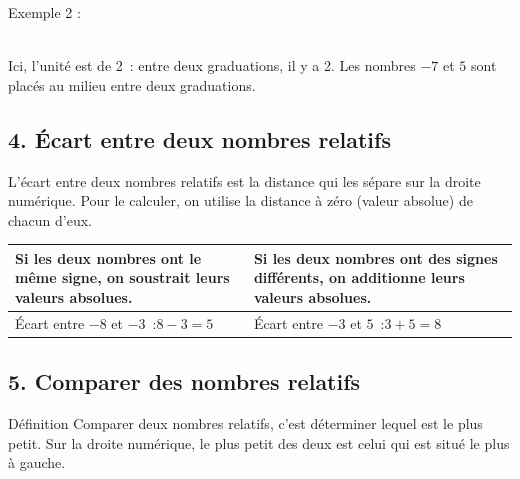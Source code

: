 \vspace{10pt}
Exemple 2 :

\begin{center}
\\[6pt]
Ici, l'unité est de 2~: entre deux graduations, il y a 2. Les nombres $-7$ et $5$ sont placés au milieu entre deux graduations.
\end{center}

\vfill
\subsection*{4. Écart entre deux nombres relatifs}

L'\textcolor{themeNO}{écart} entre deux nombres relatifs est la distance qui les sépare sur la droite numérique. Pour le calculer, on utilise la distance à zéro (valeur absolue) de chacun d'eux.

\vspace{10pt}
\def\arraystretch{2}
\begin{tabularx}{\linewidth}{|>{\raggedright\arraybackslash}X|>{\raggedright\arraybackslash}X|}
\hline
Si les deux nombres ont \textcolor{themeNO}{le même signe}, on \textcolor{themeNO}{soustrait} leurs valeurs absolues. & Si les deux nombres ont \textcolor{themeNO}{des signes différents}, on \textcolor{themeNO}{additionne} leurs valeurs absolues.\\\hline
Écart entre $-8$ et $-3$~:\newline $8-3=5$ & Écart entre $-3$ et $5$~:\newline $3+5=8$\\\hline
\end{tabularx}
\def\arraystretch{1}

\newpage
\subsection*{5. Comparer des nombres relatifs}

\begin{regle}{Définition}
\textcolor{themeNO}{Comparer} deux nombres relatifs, c'est déterminer lequel est le plus petit. Sur la droite numérique, le plus petit des deux est celui qui est situé le plus à gauche.
\end{regle}

